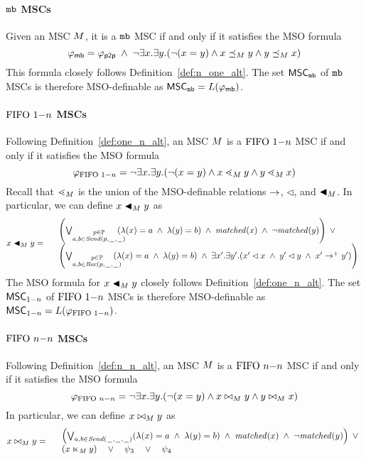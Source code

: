 \paragraph*{$\mathtt{mb}$ MSCs}

Given an MSC $M$, it is a $\mathtt{mb}$ MSC if and only if it satisfies the MSO formula
\[
	\varphi_{\mathsf{mb}} = \varphi_{\mathsf{p2p}} \;\wedge\; \neg \exists x.\exists y.(\neg (x = y) \wedge x \preceq_M y \wedge y \preceq_M x)
\]
This formula closely follows Definition~\ref{def:n_one_alt}. The set $\mathsf{MSC}_{\mathtt{mb}}$ of $\mathtt{mb}$ MSCs is therefore MSO-definable as $\mathsf{MSC}_{\mathtt{mb}}=L(\varphi_{\mathsf{mb}})$.

\paragraph*{$\text{FIFO } 1\mathsf{-}n$ MSCs}

Following Definition~\ref{def:one_n_alt}, an MSC $M$ is a $\text{FIFO } 1\mathsf{-}n$ MSC if and only if it satisfies the MSO formula
\[
	\varphi_{\text{FIFO } 1\mathsf{-}n} = \neg \exists x.\exists y.(\neg (x = y) \wedge x \lessdot_M y \wedge y \lessdot_M x)
\]
Recall that $\lessdot_M$ is the union of the MSO-definable relations $\to$, $\lhd$, and $\blacktriangleleft_M$. In particular, we can define $x \blacktriangleleft_M y$ as 
\[
x \blacktriangleleft_M y =
\begin{array}{rl}
& \left(
	\bigvee_{\substack{p \in \mathbb{P}\\a,b \in {\mathit{Send}(p,\hspace{0.1em}\underline{\hspace{0.5em}}\hspace{0.1em},\hspace{0.1em}\underline{\hspace{0.5em}}\hspace{0.1em})}}}\hspace{-1em}
	(\lambda(x) = a \;\wedge\; \lambda(y) = b)
	\;\wedge\; \mathit{matched}(x) \;\wedge\; \neg \mathit{matched}(y)
\right) \;\vee\\
& \left(
	\bigvee_{\substack{p \in \mathbb{P}\\a,b \in {\mathit{Rec}(p,\hspace{0.1em}\underline{\hspace{0.5em}}\hspace{0.1em},\hspace{0.1em}\underline{\hspace{0.5em}}\hspace{0.1em})}}}\hspace{-1em}
	(\lambda(x) = a \;\wedge\; \lambda(y) = b)
	\;\wedge\; 
	\exists x'.\exists y'. (x' \lhd x \;\wedge\; y' \lhd y \;\wedge\; x' \to^+ y')
\right)\\
\end{array}
\]
The MSO formula for $x \blacktriangleleft_M y$ closely follows Definition~\ref{def:one_n_alt}. The set $\mathsf{MSC}_{1\mathsf{-}n}$ of $\text{FIFO } 1\mathsf{-}n$ MSCs is therefore MSO-definable as $\mathsf{MSC}_{1\mathsf{-}n}=L(\varphi_{\text{FIFO } 1\mathsf{-}n})$.

\paragraph*{$\text{FIFO } n\mathsf{-}n$ MSCs}

Following Definition~\ref{def:n_n_alt}, an MSC $M$ is a $\text{FIFO } n\mathsf{-}n$ MSC if and only if it satisfies the MSO formula
\[
	\varphi_{\text{FIFO } n\mathsf{-}n} = \neg \exists x.\exists y.(\neg (x = y) \wedge x \bowtie_M y \wedge y \bowtie_M x)
\]
In particular, we can define $x \bowtie_M y$ as
\[
	x \bowtie_M y =
	\begin{array}{rl}
	& \left(
		\bigvee_{\substack{a,b \in {\mathit{Send}(\hspace{0.1em}\underline{\hspace{0.5em}}\hspace{0.1em},\hspace{0.1em}\underline{\hspace{0.5em}}\hspace{0.1em},\hspace{0.1em}\underline{\hspace{0.5em}}\hspace{0.1em})}}}
		(\lambda(x) = a \;\wedge\; \lambda(y) = b)
		\;\wedge\; \mathit{matched}(x) \;\wedge\; \neg \mathit{matched}(y)
	\right) \;\vee\\
	& (x \ltimes_M y) \quad \vee \quad \psi_3 \quad \vee \quad \psi_4\\
	\end{array}
\]


